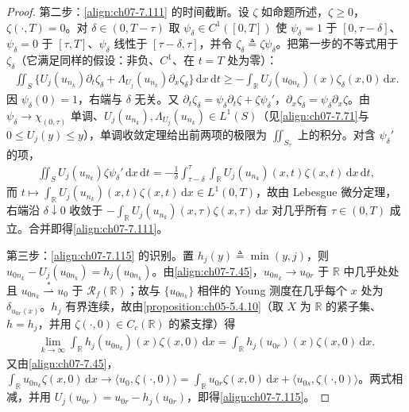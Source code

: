 \documentclass[../../main.tex]{subfiles}%
\begin{document}
\begin{proof}
第二步：\eqref{align:ch07-7.111} 的时间截断。设 $\zeta$ 如命题所述，$\zeta\geqslant0$，$\zeta(\cdot,T)=0$。对 $\delta\in(0,T-\tau)$ 取 $\psi_\delta\in C^1([0,T])$ 使 $\psi_\delta=1$ 于 $[0,\tau-\delta]$、$\psi_\delta=0$ 于 $[\tau,T]$、$\psi_\delta$ 线性于 $[\tau-\delta,\tau]$，并令 $\zeta_\delta\triangleq\zeta\psi_\delta$。把第一步的不等式用于 $\zeta_\delta$（它满足同样的假设：非负、$C^1$、在 $t=T$ 处为零）：
\begin{align*}
\iint_S\{U_j(u_{n_k})\partial_t\zeta_\delta+\Lambda_{U_j}(u_{n_k})\partial_x\zeta_\delta\}\,\mathrm{d}x\,\mathrm{d}t
\geqslant-\int_{\mathbb{R}}U_j(u_{0n_k})(x)\zeta_\delta(x,0)\,\mathrm{d}x.
\end{align*}
因 $\psi_\delta(0)=1$，右端与 $\delta$ 无关。又 $\partial_t\zeta_\delta=\psi_\delta\partial_t\zeta+\zeta\psi_\delta'$，$\partial_x\zeta_\delta=\psi_\delta\partial_x\zeta$。由 $\psi_\delta\to\chi_{(0,\tau)}$ 单调、$U_j(u_{n_k}),\Lambda_{U_j}(u_{n_k})\in L^1(S)$（见\eqref{align:ch07-7.71}与 $0\leqslant U_j(y)\leqslant y$），单调收敛定理给出前两项的极限为 $\iint_{S_\tau}$ 上的积分。对含 $\psi_\delta'$ 的项，
\begin{align*}
\iint_SU_j(u_{n_k})\zeta\psi_\delta'\,\mathrm{d}x\,\mathrm{d}t
=-\frac1\delta\int_{\tau-\delta}^{\tau}\!\!\int_{\mathbb{R}}U_j(u_{n_k})(x,t)\zeta(x,t)\,\mathrm{d}x\,\mathrm{d}t,
\end{align*}
而 $t\mapsto\int_{\mathbb{R}}U_j(u_{n_k})(x,t)\zeta(x,t)\,\mathrm{d}x\in L^1(0,T)$，故由 Lebesgue 微分定理，右端沿 $\delta\downarrow0$ 收敛于 $-\int_{\mathbb{R}}U_j(u_{n_k})(x,\tau)\zeta(x,\tau)\,\mathrm{d}x$ 对几乎所有 $\tau\in(0,T)$ 成立。合并即得\eqref{align:ch07-7.111}。

第三步：\eqref{align:ch07-7.115} 的识别。置 $h_j(y)\triangleq\min(y,j)$，则 $u_{0n_k}-U_j(u_{0n_k})=h_j(u_{0n_k})$。由\eqref{align:ch07-7.45}，$u_{0n_k}\to u_{0r}$ 于 $\mathbb{R}$ 中几乎处处且 $u_{0n_k}\stackrel{*}{\rightharpoonup}u_0$ 于 $\mathscr{R}_f(\mathbb{R})$；故与 $\{u_{0n_k}\}$ 相伴的 Young 测度在几乎每个 $x$ 处为 $\delta_{u_{0r}(x)}$。$h_j$ 有界连续，故由\cref{proposition:ch05-5.4.10}（取 $X$ 为 $\mathbb{R}$ 的紧子集、$h=h_j$，并用 $\zeta(\cdot,0)\in C_c(\mathbb{R})$ 的紧支撑）得
\begin{align*}
\lim_{k\to\infty}\int_{\mathbb{R}}h_j(u_{0n_k})(x)\zeta(x,0)\,\mathrm{d}x=\int_{\mathbb{R}}h_j(u_{0r})(x)\zeta(x,0)\,\mathrm{d}x.
\end{align*}
又由\eqref{align:ch07-7.45}，$\int_{\mathbb{R}}u_{0n_k}\zeta(x,0)\,\mathrm{d}x\to\langle u_0,\zeta(\cdot,0)\rangle=\int_{\mathbb{R}}u_{0r}\zeta(x,0)\,\mathrm{d}x+\langle u_{0s},\zeta(\cdot,0)\rangle$。两式相减，并用 $U_j(u_{0r})=u_{0r}-h_j(u_{0r})$，即得\eqref{align:ch07-7.115}。


\end{proof}
\end{document}
